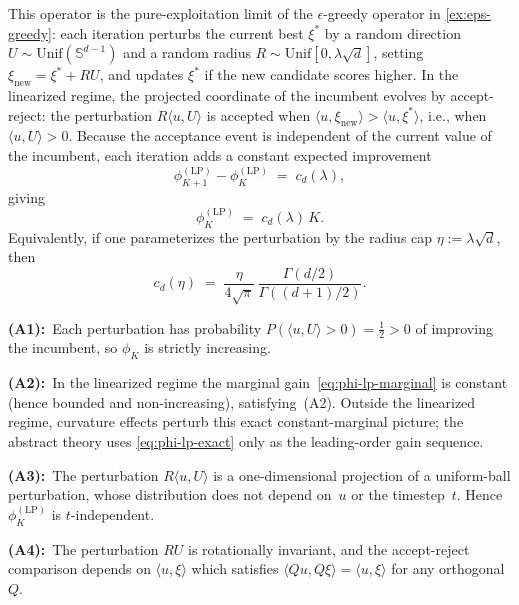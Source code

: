 \begin{example}[Local perturbation search ($\epsilon$-greedy with $\epsilon=0$)]
\label{ex:local-perturbation}
This operator is the pure-exploitation limit of the $\epsilon$-greedy
operator in \cref{ex:eps-greedy}: each iteration perturbs the
current best $\xi^*$ by a random direction
$U\sim\mathrm{Unif}(\mathbb{S}^{d-1})$ and a random radius
$R\sim\mathrm{Unif}[0,\lambda\sqrt d]$, setting
$\xi_{\mathrm{new}}=\xi^*+RU$, and updates $\xi^*$ if the
new candidate scores higher.
In the linearized regime, the projected coordinate of the
incumbent evolves by accept-reject: the perturbation
$R\langle u,U\rangle$ is
accepted when $\langle u,\xi_{\mathrm{new}}\rangle
>\langle u,\xi^*\rangle$, i.e., when $\langle u,U\rangle>0$.
Because the acceptance event is independent of the current
value of the incumbent, each iteration adds a constant expected
improvement
\begin{equation}
  \phi_{K+1}^{(\mathrm{LP})}-\phi_K^{(\mathrm{LP})}
  \;=\;
  c_d(\lambda),
  \label{eq:phi-lp-marginal}
\end{equation}
giving
\begin{equation}
  \phi_K^{(\mathrm{LP})}
  \;=\;
  c_d(\lambda)\,K.
  \label{eq:phi-lp-exact}
\end{equation}
Equivalently, if one parameterizes the perturbation by the radius cap
$\eta:=\lambda\sqrt d$, then
\[
  c_d(\eta)
  \;=\;
  \frac{\eta}{4\sqrt{\pi}}\,
  \frac{\Gamma(d/2)}{\Gamma((d+1)/2)}.
\]

\textbf{(A1):}~Each perturbation has probability
$P(\langle u,U\rangle>0)=\tfrac{1}{2}>0$ of improving the
incumbent, so $\phi_K$ is strictly increasing.

\textbf{(A2):}~In the linearized regime the marginal
gain~\eqref{eq:phi-lp-marginal} is constant (hence bounded
and non-increasing), satisfying~(A2).
Outside the linearized regime, curvature effects perturb this exact
constant-marginal picture; the abstract theory uses
\eqref{eq:phi-lp-exact} only as the leading-order gain sequence.

\textbf{(A3):}~The perturbation
$R\langle u,U\rangle$ is a one-dimensional projection of a
uniform-ball perturbation, whose distribution does not depend on~$u$
or the timestep~$t$.
Hence $\phi_K^{(\mathrm{LP})}$ is $t$-independent.

\textbf{(A4):}~The perturbation $RU$ is
rotationally invariant, and the accept-reject comparison depends
on $\langle u,\xi\rangle$ which satisfies
$\langle Qu,Q\xi\rangle=\langle u,\xi\rangle$ for any
orthogonal~$Q$.
\end{example}

